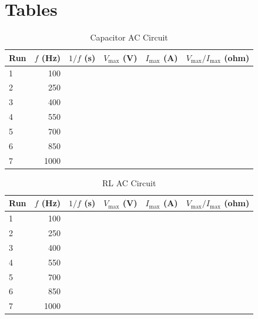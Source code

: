 \section{Tables}
\begin{table}[ht]
	\begin{center}
		\begin{tabular}{|l|r|r|r|r|r|}\hline
			Run & $f$ (Hz) & $1/f$ (s) & $V_{\text{max}}$ (V) & $I_{\text{max}}$ (A) & $V_{\text{max}}/I_{\text{max}}$ (ohm) \\
			\hline
			1 & 100 & & & & \\
			2 & 250 & & & & \\
			3 & 400 & & & & \\
			4 & 550 & & & & \\
			5 & 700 & & & & \\
			6 & 850 & & & & \\
			7 & 1000 & & & & \\
			\hline
		\end{tabular}
	\end{center}
	\caption{Capacitor AC Circuit}
	\label{table.capacitor.student}
\end{table}
\begin{table}[ht]
	\begin{center}
		\begin{tabular}{|l|r|r|r|r|r|}\hline
			Run & $f$ (Hz) & $1/f$ (s) & $V_{\text{max}}$ (V) & $I_{\text{max}}$ (A) & $V_{\text{max}}/I_{\text{max}}$ (ohm) \\
			\hline
			1 & 100 & & & & \\
			2 & 250 & & & & \\
			3 & 400 & & & & \\
			4 & 550 & & & & \\
			5 & 700 & & & & \\
			6 & 850 & & & & \\
			7 & 1000 & & & & \\
			\hline
		\end{tabular}
	\end{center}
	\caption{RL AC Circuit}
	\label{table.RL.student}
\end{table}
